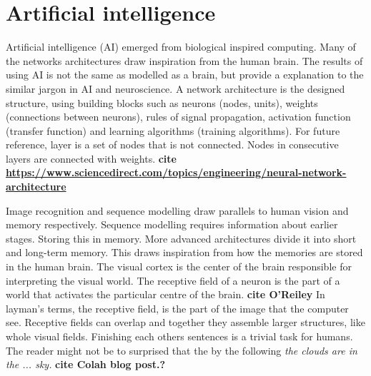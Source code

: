 \documentclass{article}
\begin{document}
\section{Artificial intelligence}
Artificial intelligence (AI) emerged from biological inspired computing. Many of the networks architectures draw inspiration from the human brain. The results of using AI is not the same as modelled as a brain, but provide a explanation to the similar jargon in AI and neuroscience. A network architecture is the designed structure, using building blocks such as neurons (nodes, units), weights (connections between neurons), rules of signal propagation, activation function (transfer function) and learning algorithms (training algorithms). For future reference, layer is a set of nodes that is not connected. Nodes in consecutive layers are connected with weights. \textbf{cite \href{https://www.sciencedirect.com/topics/engineering/neural-network-architecture}{\textbf{https://www.sciencedirect.com/topics/engineering/neural-network-architecture}}}

Image recognition and sequence modelling draw parallels to human vision and memory respectively. Sequence modelling requires information about earlier stages. Storing this in memory. More advanced architectures divide it into short and long-term memory. This draws inspiration from how the memories are stored in the human brain. The visual cortex is the center of the brain responsible for interpreting the visual world. The receptive field of a neuron is the part of a world that activates the particular centre of the brain. \textbf{cite O'Reiley} In layman's terms, the receptive field, is the part of the image that the computer see. Receptive fields can overlap and together they assemble larger structures, like whole visual fields. Finishing each others sentences is a trivial task for humans. The reader might not be to surprised that the by the following \textit{the clouds are in the ... sky.} \textbf{cite Colah blog post.?}
\end{document}
